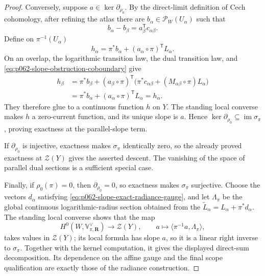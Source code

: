 \begin{proof}
Conversely, suppose
$a\in\ker\partial_{\rho_0}$.  By the direct-limit definition of Cech
cohomology, after refining the atlas there are
$b_\alpha\in\mathscr P_W(U_\alpha)$ such that
\begin{equation}
\label{eq:p062-slope-obstruction-coboundary}
 b_\alpha-b_\beta=a_\beta^{\mathsf T}c_{\alpha\beta}.
\end{equation}
Define on $\pi^{-1}(U_\alpha)$
\[
 h_\alpha=\pi^*b_\alpha
 +(a_\alpha\circ\pi)^{\mathsf T}L_\alpha.
\]
On an overlap, the logarithmic transition law, the dual transition law,
and \eqref{eq:p062-slope-obstruction-coboundary} give
\begin{align*}
 h_\beta
 &=\pi^*b_\beta
   +(a_\beta\circ\pi)^{\mathsf T}
     \bigl(\pi^*c_{\alpha\beta}
            +(M_{\alpha\beta}\circ\pi)L_\alpha\bigr)\\
 &=\pi^*b_\alpha
   +(a_\alpha\circ\pi)^{\mathsf T}L_\alpha
 =h_\alpha.
\end{align*}
They therefore glue to a continuous function $h$ on $Y$.  The standing
local converse makes $h$ a zero-current function, and its unique slope is
$a$.  Hence
$\ker\partial_{\rho_0}\subseteq\operatorname{im}\sigma_\pi$, proving
exactness at the parallel-slope term.

If $\partial_{\rho_0}$ is injective, exactness makes
$\sigma_\pi$ identically zero, so the already proved exactness at
$\mathscr Z(Y)$ gives the asserted descent.  The vanishing of the space of
parallel dual sections is a sufficient special case.

Finally, if $\rho_0(\pi)=0$, then $\partial_{\rho_0}=0$, so exactness makes
$\sigma_\pi$ surjective.  Choose the vectors $d_\alpha$ satisfying
\eqref{eq:p062-slope-exact-radiance-gauge}, and let $\Lambda_\pi$ be the
global continuous logarithmic-radius section obtained from the
$\widetilde L_\alpha=L_\alpha+\pi^*d_\alpha$.  The standing local converse
shows that the map
\[
 H^0(W,\mathbb V_{\pi,\mathbf R}^{\vee})\longrightarrow\mathscr Z(Y),
 \qquad
 a\longmapsto\langle\pi^{-1}a,\Lambda_\pi\rangle,
\]
takes values in $\mathscr Z(Y)$; its local formula has slope $a$, so it is
a linear right inverse to $\sigma_\pi$.
Together with the kernel computation, it gives the displayed direct-sum
decomposition.  Its dependence on the affine gauge and the final scope
qualification are exactly those of the radiance construction.
\end{proof}
